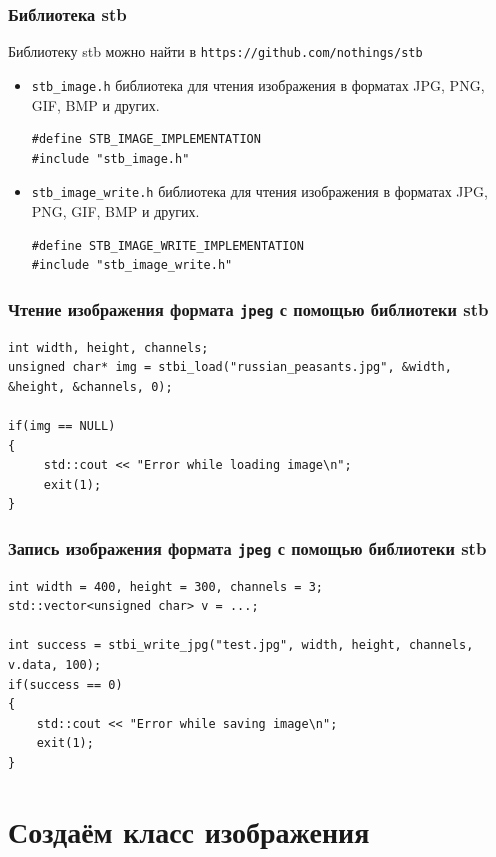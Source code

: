 \documentclass[10pt,pdf,hyperref={unicode}]{beamer}
\begin{document}
\begin{frame}[fragile]
\frametitle{Библиотека stb} 

Библиотеку stb можно найти в \texttt{https://github.com/nothings/stb}

\begin{itemize}
\item \texttt{stb\_image.h} библиотека для чтения изображения в форматах JPG, PNG, GIF, BMP и других.
\begin{lstlisting}
#define STB_IMAGE_IMPLEMENTATION
#include "stb_image.h"
\end{lstlisting}

\item \texttt{stb\_image\_write.h} библиотека для чтения изображения в форматах JPG, PNG, GIF, BMP и других.
\begin{lstlisting}
#define STB_IMAGE_WRITE_IMPLEMENTATION
#include "stb_image_write.h"
\end{lstlisting}
\end{itemize}
\end{frame}

\begin{frame}[fragile]
\frametitle{Чтение изображения формата \texttt{jpeg} с помощью библиотеки stb} 
\begin{lstlisting}
int width, height, channels;
unsigned char* img = stbi_load("russian_peasants.jpg", &width, &height, &channels, 0);
    
if(img == NULL)
{
     std::cout << "Error while loading image\n";
     exit(1);
}
\end{lstlisting}
\end{frame}


\begin{frame}[fragile]
\frametitle{Запись изображения формата \texttt{jpeg} с помощью библиотеки stb} 
\begin{lstlisting}
int width = 400, height = 300, channels = 3;
std::vector<unsigned char> v = ...;

int success = stbi_write_jpg("test.jpg", width, height, channels, v.data, 100);
if(success == 0)
{
    std::cout << "Error while saving image\n";
    exit(1);
}
\end{lstlisting}
\end{frame}


\section*{Создаём класс изображения}
\end{document}
